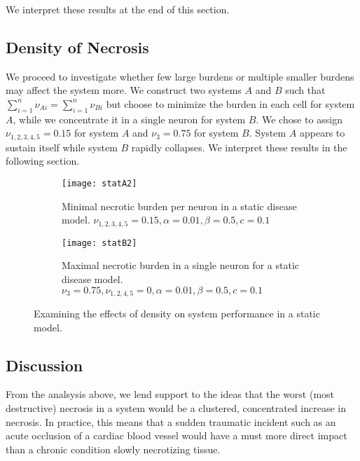 \documentclass[11pt]{report}
\begin{document}
We interpret these results at the end of this section. 

\subsection{Density of Necrosis} %
\label{sub:density_of_necrosis}



We proceed to investigate whether few large burdens or multiple smaller burdens may affect the system more. We construct two systems $A$ and $B$ such that $\sum^n_{i=1} \nu_{Ai} = \sum^n_{i=1} \nu_{Bi}$ but choose to minimize the burden in each cell for system $A$, while we concentrate it in a single neuron for system $B$. We chose to assign $\nu_{1,2,3,4,5}= 0.15$ for system $A$ and $\nu_3 = 0.75$ for system $B$. System $A$ appears to sustain itself while system $B$ rapidly collapses. We interpret these results in the following section.

\begin{figure}
    \centering
    \begin{subfigure}[b]{0.48\textwidth}
        \texttt{[image: statA2]}
        \caption{Minimal necrotic burden per neuron in a static disease model. $\nu_{1,2,3,4,5} = 0.15, \alpha = 0.01, \beta = 0.5,c = 0.1$}
        \label{fig:statA2}
    \end{subfigure}
    \hfill %
    \begin{subfigure}[b]{0.48\textwidth}
        \texttt{[image: statB2]}
        \caption{Maximal necrotic burden in a single neuron for a static disease model. $\nu_{3} = 0.75, \nu_{1,2,4,5} = 0, \alpha = 0.01, \beta = 0.5,c = 0.1$}
        \label{fig:statB2}
    \end{subfigure}
    \caption{Examining the effects of density on system performance in a static model.}\label{fig:density}
\end{figure}


\subsection{Discussion} %
\label{sub:discussion}

From the analsysis above, we lend support to the ideas that the worst (most destructive) necrosis in a system would be a clustered, concentrated increase in necrosis. In practice, this means that a sudden traumatic incident such as an acute occlusion of a cardiac blood vessel would have a must more direct impact than a chronic condition slowly necrotizing tissue.
\end{document}
